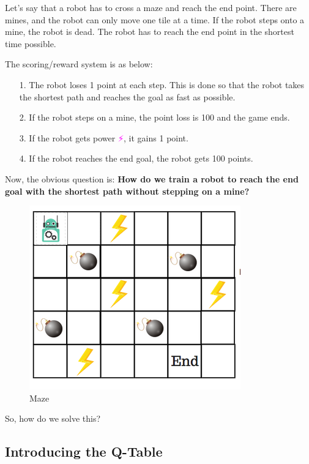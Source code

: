Let's say that a robot has to cross a maze and reach the end point. There are mines, 
and the robot can only move one tile at a time. If the robot steps onto a mine, the 
robot is dead. The robot has to reach the end point in the shortest time possible.

The scoring/reward system is as below:
\begin{itemize}
\setlength{\parskip}{0pt}
\item[1.]
The robot loses 1 point at each step. This is done so that the robot takes the 
shortest path and reaches the goal as fast as possible.

\item[2.]
If the robot steps on a mine, the point loss is 100 and the game ends.

\item[3.]
If the robot gets power \textcolor{magenta}{⚡️}, it gains 1 point.

\item[4.]
If the robot reaches the end goal, the robot gets 100 points.
\end{itemize}

Now, the obvious question is: {\bf How do we train a robot to reach the end goal 
with the shortest path without stepping on a mine?}

\begin{figure}[!htb]
\centering
\includegraphics[scale=0.618]{pix/q_learning/q_robot_maze.png}
\caption{Maze}
\end{figure}
So, how do we solve this?


\subsection{Introducing the Q-Table}

